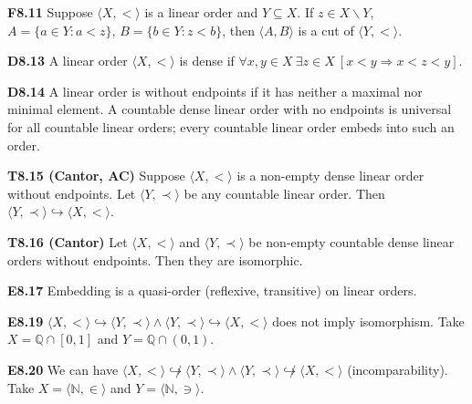 \documentclass[10pt, landscape]{article}
\begin{document}
\begin{multicols*}{3}
\textbf{F8.11} Suppose $\langle X, < \rangle$ is a linear order and $Y \subseteq X$. If $z \in X \backslash Y$, $A=\{a \in Y:a<z\}$, $B=\{b \in Y: z <b\}$, then $\langle A, B \rangle$ is a cut of $\langle Y, < \rangle$.

\textbf{D8.13} A linear order $\langle X, < \rangle$ is dense if $\forall x, y \in X \ \exists z \in X \ [x < y \Rightarrow x < z < y]$.

\textbf{D8.14} A linear order is without endpoints if it has neither a maximal nor minimal element. A countable dense linear order with no endpoints is universal for all countable linear orders; every countable linear order embeds into such an order.

\textbf{T8.15 (Cantor, AC)} Suppose $\langle X, < \rangle$ is a non-empty dense linear order without endpoints. Let $\langle Y, \prec \rangle$ be any countable linear order. Then $\langle Y, \prec \rangle \hookrightarrow \langle X, < \rangle$.

\textbf{T8.16 (Cantor)} Let $\langle X, < \rangle$ and $\langle Y, \prec \rangle$ be non-empty countable dense linear orders without endpoints. Then they are isomorphic.

\textbf{E8.17} Embedding is a quasi-order (reflexive, transitive) on linear orders.

\textbf{E8.19} $\langle X, < \rangle \hookrightarrow \langle Y, \prec \rangle \land \langle Y, \prec \rangle \hookrightarrow \langle X, < \rangle$ does not imply isomorphism. Take $X=\mathbb{Q} \cap [0, 1]$ and $Y=\mathbb{Q} \cap (0, 1)$.

\textbf{E8.20} We can have $\langle X, < \rangle \not \hookrightarrow \langle Y, \prec \rangle \land \langle Y, \prec \rangle \not \hookrightarrow \langle X, < \rangle$ (incomparability). Take $X=\langle \mathbb{N}, \in \rangle$ and $Y=\langle \mathbb{N}, \ni \rangle$.


\end{multicols*}
\end{document}

